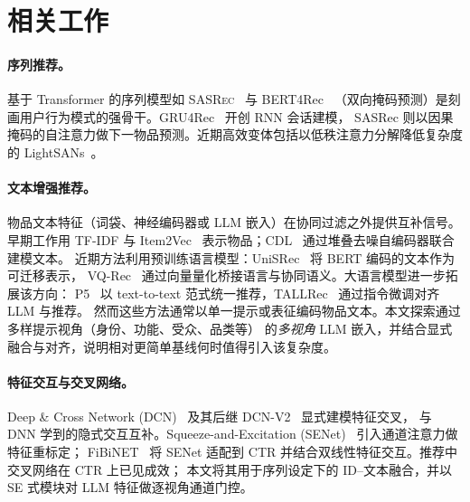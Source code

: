 \documentclass[sigconf,natbib=true,anonymous]{acmart}
\newcommand{\base}{\textsc{SASRec}\xspace}
\newcommand{\llm}{\textsc{LLM}\xspace}
\begin{document}

\section{相关工作}
\paragraph{序列推荐。}
基于 Transformer 的序列模型如 \base~\cite{kang2018sasrec} 与 BERT4Rec~\cite{sun2019bert4rec}
（双向掩码预测）是刻画用户行为模式的强骨干。GRU4Rec~\cite{hidasi2016gru4rec} 开创 RNN 会话建模，
SASRec 则以因果掩码的自注意力做下一物品预测。近期高效变体包括以低秩注意力分解降低复杂度的
LightSANs~\cite{fan2021lightsans}。

\paragraph{文本增强推荐。}
\begin{sloppypar}
物品文本特征（词袋、神经编码器或 \llm 嵌入）在协同过滤之外提供互补信号。早期工作用 TF-IDF 与
Item2Vec~\cite{barkan2016item2vec} 表示物品；CDL~\cite{wang2015cdl} 通过堆叠去噪自编码器联合建模文本。
近期方法利用预训练语言模型：UniSRec~\cite{hou2022unisrec} 将 BERT 编码的文本作为可迁移表示，
VQ-Rec~\cite{hou2023vqrec} 通过向量量化桥接语言与协同语义。大语言模型进一步拓展该方向：
P5~\cite{geng2022p5} 以 text-to-text 范式统一推荐，TALLRec~\cite{bao2023tallrec} 通过指令微调对齐 LLM 与推荐。
然而这些方法通常以单一提示或表征编码物品文本。本文探索通过多样提示视角（身份、功能、受众、品类等）
的\emph{多视角} \llm 嵌入，并结合显式融合与对齐，说明相对更简单基线何时值得引入该复杂度。
\end{sloppypar}

\paragraph{特征交互与交叉网络。}
\begin{sloppypar}
Deep \& Cross Network (DCN)~\cite{wang2017dcn} 及其后继 DCN-V2~\cite{wang2021dcnv2} 显式建模特征交叉，
与 DNN 学到的隐式交互互补。Squeeze-and-Excitation (SENet)~\cite{hu2018senet} 引入通道注意力做特征重标定；
FiBiNET~\cite{huang2019fibinet} 将 SENet 适配到 CTR 并结合双线性特征交互。推荐中交叉网络在 CTR 上已见成效；
本文将其用于序列设定下的 ID--文本融合，并以 SE 式模块对 \llm 特征做逐视角通道门控。
\end{sloppypar}
\end{document}
